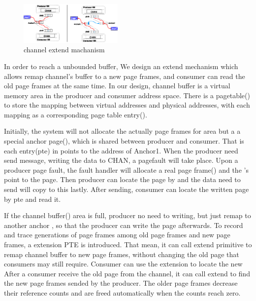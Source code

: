 \begin{figure}[!h!t]  
	\centering
	\includegraphics[width=0.45\textwidth]{eps/chan_extend.eps}
	\caption{channel extend machanism}
	\label{fig:spmckern:extend}
\end{figure}
In order to reach a unbounded buffer,
We design an extend mechanism 
which allows remap channel’s buffer to a new page frames,
and consumer can read the old page frames at the same time.
In our design, channel buffer is a virtual memory area 
in the producer and consumer address space.
There is a pagetable() to store the mapping between virtual addresses and physical addresses, with each mapping as a corresponding page table entry().

Initially, the system will not allocate the actually page frames for  area but a a special anchor page(),
which is shared between producer and consumer.
That is each entry(pte) in  points to the address of Anchor1.
When the producer need send message, 
writing the data to CHAN, a pagefault will take place.
Upon a producer page fault, the fault handler will allocate a real page frame() and the 's  point to the page. 
Then producer can locate the page by  and the data need to send will copy to this  lastly.
After sending, consumer can locate the written page by pte 
and read it.

If the channel buffer() area is full, 
producer no need to writing, 
but just remap  to another anchor ,
so that the producer can write the page afterwards.
To record and trace generations of page frames among old page frames 
and new page frames, a extension PTE is introduced.
That mean,
it can call extend primitive to remap channel buffer to new page frames,
without changing the old page that consumers may still require. 
Consumer can use the extension  to locate the new
After a consumer receive the old page from the channel, 
it can call extend to find the new page frames sended by the
producer.
The older page frames decrease their reference counts and
are freed automatically when the counts reach zero.






